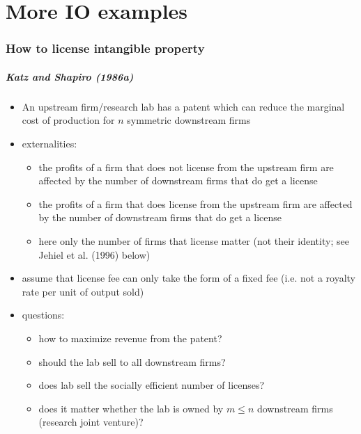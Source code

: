 \documentclass[11pt,english]{beamer}
\begin{document}
\part[lecture 2]{More IO examples}
\label{sec-1}
\section{How to license intangible property}
\label{sec-2}
\begin{frame}[allowframebreaks]\frametitle{Katz and Shapiro (1986a)}
\label{sec-2-1}
\begin{itemize}

\item An upstream firm/research lab has a patent which can reduce the marginal cost of production for $n$ symmetric downstream firms\\
\label{sec-2-1-1}%
\item externalities:
\label{sec-2-1-2}%
\begin{itemize}

\item the profits of a firm that does not license from the upstream firm are affected by the number of downstream firms that do get a license\\
\label{sec-2-1-2-1}%
\item the profits of a firm that does license from the upstream firm are affected by the number of downstream firms that do get a license\\
\label{sec-2-1-2-2}%
\item here only the number of firms that license matter (not their identity; see Jehiel et al. (1996) below)\\
\label{sec-2-1-2-3}%
\end{itemize} %

\item assume that license fee can only take the form of a fixed fee (i.e. not a royalty rate per unit of output sold)\\
\label{sec-2-1-3}%
\item questions:
\label{sec-2-1-4}%
\begin{itemize}

\item how to maximize revenue from the patent?\\
\label{sec-2-1-4-1}%
\item should the lab sell to all downstream firms?\\
\label{sec-2-1-4-2}%
\item does lab sell the socially efficient number of licenses?\\
\label{sec-2-1-4-3}%
\item does it matter whether the lab is owned by $m \leq n$ downstream firms (research joint venture)?\\
\label{sec-2-1-4-4}%
\end{itemize} %
\end{itemize} %
\end{frame}
\end{document}
